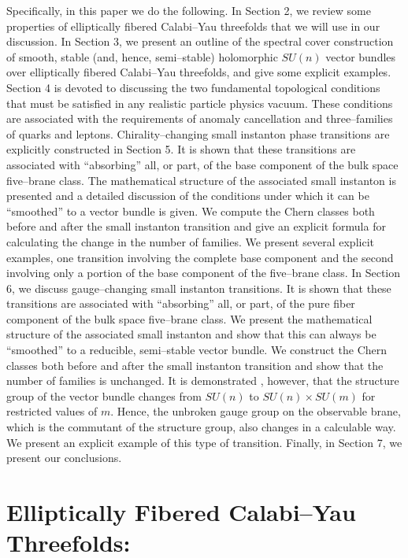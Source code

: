 \documentclass[a4paper,12pt]{article}
\numberwithin{equation}{section}
\theoremstyle{plain}
\begin{document}
Specifically, in this paper we do the following. In Section 2, we review some
properties of elliptically fibered Calabi--Yau threefolds that we will use in
our discussion. In Section 3, we present an outline of the spectral cover
construction of smooth, stable (and, hence, semi--stable) 
holomorphic $SU(n)$ vector bundles over elliptically
fibered Calabi--Yau threefolds, and give some explicit examples. Section 4 is
devoted to discussing the two fundamental topological conditions that must be
satisfied in any realistic particle physics vacuum. These conditions are
associated with the requirements of anomaly cancellation and 
three--families of quarks and leptons. Chirality--changing small instanton
phase transitions are explicitly constructed in Section 5. It is shown that
these transitions are associated with ``absorbing'' all, or part, of the
base component of the bulk space five--brane class. The mathematical
structure of the associated small instanton is presented and 
a detailed discussion of the
conditions under which it can be ``smoothed'' to a vector bundle is
given. We compute the Chern classes both before and after the small
instanton transition and give an explicit formula for calculating the change
in the number of families. We present several explicit examples, one
transition involving the complete base component and the second involving 
only a portion of the base component of the five--brane class. In Section 6,
we discuss gauge--changing small instanton transitions. It is shown that these
transitions are associated with ``absorbing'' all, or part, of the pure fiber
component of the bulk space five--brane class. We present the mathematical
structure of the associated small instanton and show that this can always be
``smoothed'' to a reducible, semi--stable vector bundle. We construct 
the Chern classes both
before and after the small instanton transition and show that the number of
families is unchanged. It is demonstrated   , however, that the structure group of the
vector bundle changes from $SU(n)$ to $SU(n)\times SU(m)$ for restricted
values of $m$. Hence, the unbroken gauge group on the observable brane, which
is the commutant of the structure group, also changes in a calculable way. We
present an explicit example of this type of transition. Finally, in Section 7,
we present our conclusions.

 


\section{Elliptically Fibered Calabi--Yau Threefolds:}
\end{document}
